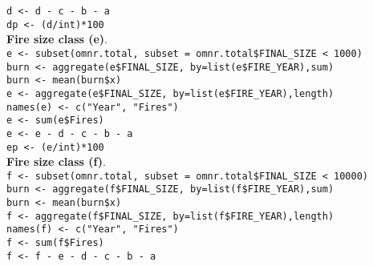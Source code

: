 \begin{spacing}{1.5}
\noindent \texttt{d <- d - c - b - a} \\

\noindent \texttt{dp <- (d/int)*100} \\

\noindent \textbf{Fire size class (e)}. \\

\noindent \texttt{e <- subset(omnr.total, subset = omnr.total\$FINAL\_SIZE < 1000)} \\

\noindent \texttt{burn <- aggregate(e\$FINAL\_SIZE, by=list(e\$FIRE\_YEAR),sum)} \\

\noindent \texttt{burn <- mean(burn\$x)} \\
                     
\noindent \texttt{e <- aggregate(e\$FINAL\_SIZE, by=list(e\$FIRE\_YEAR),length)} \\

\noindent \texttt{names(e) <- c("Year", "Fires")} \\

\noindent \texttt{e <- sum(e\$Fires)} \\

\noindent \texttt{e <- e - d - c - b - a} \\

\noindent \texttt{ep <- (e/int)*100} \\

\noindent \textbf{Fire size class (f)}. \\

\noindent \texttt{f <- subset(omnr.total, subset = omnr.total\$FINAL\_SIZE < 10000)} \\

\noindent \texttt{burn <- aggregate(f\$FINAL\_SIZE, by=list(f\$FIRE\_YEAR),sum)} \\

\noindent \texttt{burn <- mean(burn\$x)} \\
                     
\noindent \texttt{f <- aggregate(f\$FINAL\_SIZE, by=list(f\$FIRE\_YEAR),length)} \\

\noindent \texttt{names(f) <- c("Year", "Fires")} \\

\noindent \texttt{f <- sum(f\$Fires)} \\

\noindent \texttt{f <- f - e - d - c - b - a} \\


\end{spacing}
